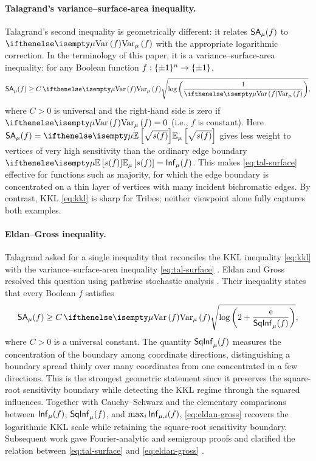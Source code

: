 \paragraph{Talagrand's variance--surface-area inequality.}
Talagrand's second inequality is geometrically different: it relates $\mathsf{SA}_\mu(f)$ to $\Var[\mu]{f}$ with the appropriate logarithmic correction. In the terminology of this paper, it is a variance--surface-area inequality: 
for any Boolean function $f:\{\pm 1\}^n\to\{\pm 1\}$, 
\begin{equation}\label{eq:tal-surface}
    \SurfArea_\mu(f)
    \geq C\,\Var[\mu]{f}
    \sqrt{\log\left(\frac{1}{\Var[\mu]{f}}\right)},
\end{equation}
where $C>0$ is universal and the right-hand side is zero if $\Var[\mu]{f} = 0$ (i.e., $f$ is constant).
Here $\SurfArea_\mu(f)=\E[\mu]{\sqrt{s(f)}}$ gives less weight to vertices of very high sensitivity than the ordinary edge boundary $\E[\mu]{s(f)}=\Inf_\mu(f)$. This makes \cref{eq:tal-surface} effective for functions such as majority, for which the edge boundary is concentrated on a thin layer of vertices with many incident bichromatic edges. 
By contrast, KKL \cref{eq:kkl} is sharp for Tribes; neither viewpoint alone fully captures both examples.

\paragraph{Eldan--Gross inequality.}
Talagrand asked for a single inequality that reconciles the KKL inequality \cref{eq:kkl} with the variance--surface-area inequality \cref{eq:tal-surface} \cite{Talagrand97}. 
Eldan and Gross resolved this question using pathwise stochastic analysis \cite{EldanGross22}. 
Their inequality states that every Boolean $f$ satisfies
\begin{equation}\label{eq:eldan-gross}
    \SurfArea_\mu(f)
    \geq C\,\Var[\mu]{f}
    \sqrt{\log\left(2+\frac{\e}{\SqInf_\mu(f)}\right)},
\end{equation}
where $C>0$ is a universal constant.
The quantity $\mathsf{SqInf}_\mu(f)$ measures the concentration of the boundary among coordinate directions, distinguishing a boundary spread thinly over many coordinates from one concentrated in a few directions. 
This is the strongest geometric statement since it preserves the square-root sensitivity boundary while detecting the KKL regime through the squared influences.
Together with Cauchy--Schwarz and the elementary comparisons between $\mathsf{Inf}_\mu(f)$, $\mathsf{SqInf}_\mu(f)$, and $\max_i\mathsf{Inf}_{\mu,i}(f)$, \cref{eq:eldan-gross} recovers the logarithmic KKL scale while retaining the square-root sensitivity boundary. Subsequent work gave Fourier-analytic and semigroup proofs and clarified the relation between \cref{eq:tal-surface} and \cref{eq:eldan-gross} \cite{EldanKindlerLifshitzMinzer25,IvanisviliZhang26}.


